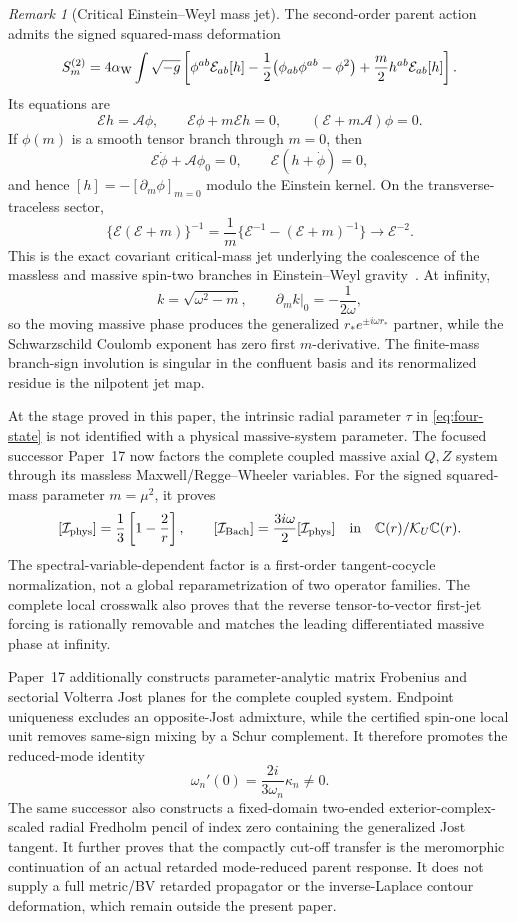 \documentclass[11pt]{article}
\theoremstyle{definition}
\theoremstyle{remark}
\newtheorem{remark}[theorem]{Remark}
\newcommand{\C}{\mathbb C}
\begin{document}
\begin{remark}[Critical Einstein--Weyl mass jet]
\label{rem:critical-mass-jet}
The second-order parent action admits the signed squared-mass deformation
\[
S_m^{(2)}
=
4\alpha_{\rm W}\int\sqrt{-g}\left[
\phi^{ab}\mathcal E_{ab}[h]
-\frac12\bigl(\phi_{ab}\phi^{ab}-\phi^2\bigr)
+\frac m2 h^{ab}\mathcal E_{ab}[h]
\right].
\]
Its equations are
\[
\mathcal E h=\mathcal A\phi,
\qquad
\mathcal E\phi+m\mathcal E h=0,
\qquad
(\mathcal E+m\mathcal A)\phi=0.
\]
If \(\phi(m)\) is a smooth tensor branch through \(m=0\), then
\[
\mathcal E\dot\phi+\mathcal A\phi_0=0,
\qquad
\mathcal E(h+\dot\phi)=0,
\]
and hence \([h]=-[\partial_m\phi]_{m=0}\) modulo the Einstein kernel.
On the transverse-traceless sector,
\[
\{\mathcal E(\mathcal E+m)\}^{-1}
=
\frac1m\{\mathcal E^{-1}-(\mathcal E+m)^{-1}\}
\longrightarrow\mathcal E^{-2}.
\]
This is the exact covariant critical-mass jet underlying the coalescence of
the massless and massive spin-two branches in Einstein--Weyl
gravity~\cite{Antoniou2025}.  At infinity,
\[
k=\sqrt{\omega^2-m},
\qquad
\partial_m k|_0=-\frac1{2\omega},
\]
so the moving massive phase produces the generalized
\(r_*e^{\pm i\omega r_*}\) partner, while the Schwarzschild Coulomb exponent
has zero first \(m\)-derivative.  The finite-mass branch-sign involution is
singular in the confluent basis and its renormalized residue is the
nilpotent jet map.

At the stage proved in this paper, the intrinsic radial parameter \(\tau\)
in \eqref{eq:four-state} is not identified with a physical massive-system
parameter.  The focused successor Paper~17 now factors the complete coupled
massive axial \(Q,Z\) system through its massless
Maxwell/Regge--Wheeler variables.  For the signed squared-mass parameter
\(m=\mu^2\), it proves
\[
 [\mathcal I_{\rm phys}]
 =\frac13\left[1-\frac2r\right],
 \qquad
 [\mathcal I_{\rm Bach}]
 =\frac{3i\omega}{2}[\mathcal I_{\rm phys}]
 \quad\hbox{in}\quad \C(r)/\mathcal K_U\C(r).
\]
The spectral-variable-dependent factor is a first-order tangent-cocycle
normalization, not a global reparametrization of two operator families.  The
complete local crosswalk also proves that the reverse tensor-to-vector
first-jet forcing is rationally removable and matches the leading
differentiated massive phase at infinity.

Paper~17 additionally constructs parameter-analytic matrix Frobenius and
sectorial Volterra Jost planes for the complete coupled system.  Endpoint
uniqueness excludes an opposite-Jost admixture, while the certified
spin-one local unit removes same-sign mixing by a Schur complement.  It
therefore promotes the reduced-mode identity
\[
 \omega_n'(0)=\frac{2i}{3\omega_n}\kappa_n\ne0.
\]
The same successor also constructs a fixed-domain two-ended
exterior-complex-scaled radial Fredholm pencil of index zero containing the
generalized Jost tangent.  It further proves that the compactly cut-off
transfer is the meromorphic continuation of an actual retarded
mode-reduced parent response.  It does not supply a full metric/BV retarded
propagator or the inverse-Laplace contour deformation, which remain outside
the present paper.
\end{remark}
\end{document}
